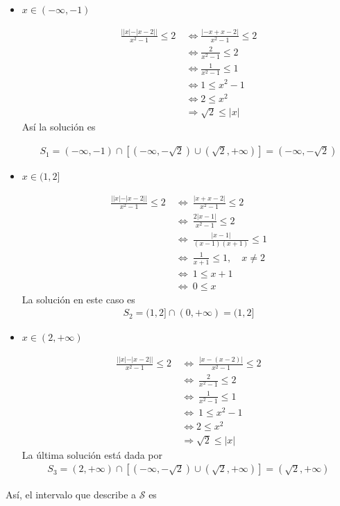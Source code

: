 \documentclass[12pt]{book}
\begin{document}
\begin{itemize}
    \item $x \in (-\infty,-1)$

    \begin{align*}
         \frac{||x|-|x-2||}{x^2-1}\leq2 \ &\Longleftrightarrow  \frac{|-x+x-2|}{x^2-1}\leq 2 \\
         &\Longleftrightarrow \frac{2}{x^2-1}\leq2 \\
         &\Longleftrightarrow \frac{1}{x^2-1}\leq 1 \\
         &\Longleftrightarrow 1 \leq x^2-1 \\
         &\Longleftrightarrow 2\leq x^2 \\
          &\Longrightarrow \sqrt{2}\leq|x|
    \end{align*}
    Así la solución es

    \begin{align*}
        S_1= (-\infty,-1) \cap [(-\infty,-\sqrt{2}) \cup (\sqrt{2},+\infty)]=(-\infty,-\sqrt{2})
    \end{align*}

    \item $x \in (1,2]$

    \begin{align*}
         \frac{||x|-|x-2||}{x^2-1}\leq2 \ &\Longleftrightarrow \ \frac{|x+x-2|}{x^2-1}\leq 2 \\
         &\Longleftrightarrow \ \frac{2|x-1|}{x^2-1}\leq 2 \\
         &\Longleftrightarrow \ \frac{|x-1|}{(x-1)(x+1)} \leq 1 \\
         &\Longleftrightarrow \ \frac{1}{x+1} \leq 1 , \quad x\neq 2 \\
         &\Longleftrightarrow \ 1 \leq x+1 \\
         &\Longleftrightarrow \ 0 \leq x
    \end{align*}
    La solución en este caso es
\begin{align*}
    S_2= (1,2] \cap (0,+ \infty)=(1,2]
\end{align*}

\item $x \in (2, +\infty)$

\begin{align*}
    \frac{||x|-|x-2||}{x^2-1}\leq2 \ &\Longleftrightarrow \ \frac{|x-(x-2)|}{x^2-1} \leq 2 \\
    &\Longleftrightarrow \ \frac{2}{x^2-1}\leq 2 \\
    &\Longleftrightarrow \ \frac{1}{x^2-1}\leq 1 \\
    &\Longleftrightarrow \ 1\leq x^2-1 \\
      &\Longleftrightarrow 2\leq x^2 \\
          &\Longrightarrow \sqrt{2}\leq|x|
\end{align*}
La última solución está dada por 
\begin{align*}
    S_3= (2, +\infty) \cap [(-\infty,-\sqrt{2}) \cup (\sqrt{2},+\infty)]= (\sqrt{2},+\infty)
\end{align*}
\end{itemize}
Así, el intervalo que describe a $\mathcal{S}$ es 
\end{document}
